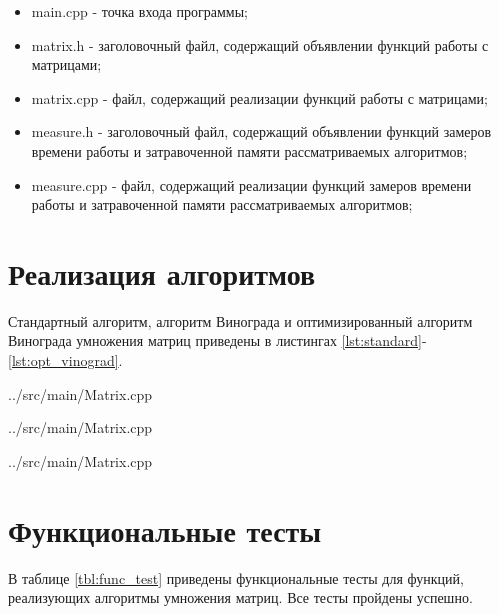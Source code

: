 \begin{itemize}
	\item main.cpp - точка входа программы;
	\item matrix.h - заголовочный файл, содержащий объявлении функций работы с матрицами;
	\item matrix.cpp - файл, содержащий реализации функций работы с матрицами;
	\item measure.h - заголовочный файл, содержащий объявлении функций замеров времени работы и затравоченной памяти рассматриваемых алгоритмов;
	\item measure.cpp - файл, содержащий реализации функций замеров времени работы и затравоченной памяти рассматриваемых алгоритмов;
\end{itemize}

\section{Реализация алгоритмов}

Стандартный алгоритм, алгоритм Винограда и оптимизированный алгоритм Винограда умножения матриц приведены в листингах \ref{lst:standard}-\ref{lst:opt_vinograd}.

\begin{lstinputlisting}[
	caption={Стандартный алгоритм умножения матриц},
	label={lst:standard},
	linerange={61-74}
	]{../src/main/Matrix.cpp}
\end{lstinputlisting}

\begin{lstinputlisting}[
	caption={Алгоритм Винограда умножения матриц},
	label={lst:vinograd},
	linerange={76-112}
	]{../src/main/Matrix.cpp}
\end{lstinputlisting}

\begin{lstinputlisting}[
	caption={Оптимизированный алгоритм Винограда умножения матриц},
	label={lst:opt_vinograd},
	linerange={114-157}
	]{../src/main/Matrix.cpp}
\end{lstinputlisting}

\clearpage

\section{Функциональные тесты}

В таблице \ref{tbl:func_test} приведены функциональные тесты для функций, реализующих алгоритмы умножения матриц. Все тесты пройдены успешно.

